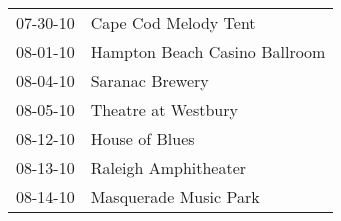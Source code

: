 \begin{supertabular}{p{0.07\textwidth}p{0.23\textwidth}}
 07-30-10 &           Cape Cod Melody Tent \\
 08-01-10 &  Hampton Beach Casino Ballroom \\
 08-04-10 &                Saranac Brewery \\
 08-05-10 &            Theatre at Westbury \\
 08-12-10 &                 House of Blues \\
 08-13-10 &           Raleigh Amphitheater \\
 08-14-10 &          Masquerade Music Park \\
\end{supertabular}
